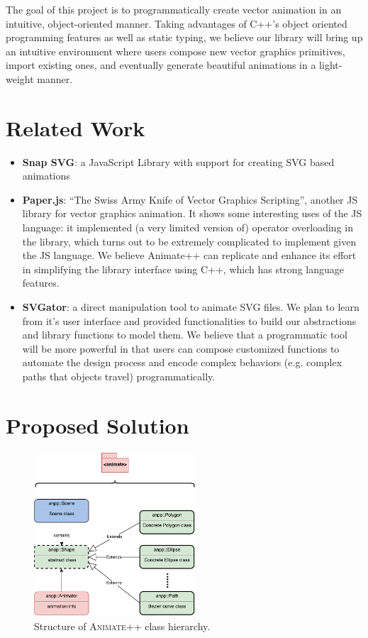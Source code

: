 \documentclass[10pt, nocopyrightspace, numbers]{assets/sigplanconf}
\begin{document}
The goal of this project is to programmatically create vector animation in an intuitive, object-oriented manner. Taking advantages of C++’s object oriented programming features as well as static typing, we believe our library will bring up an intuitive environment where users compose new vector graphics primitives, import existing ones, and eventually generate beautiful animations in a light-weight manner.

\section{Related Work}

\begin{itemize}
    \item
    \textbf{Snap SVG}: a JavaScript Library with support for creating SVG based animations
    \item
    \textbf{Paper.js}: “The Swiss Army Knife of Vector Graphics Scripting”, another JS library for vector graphics animation. It shows some interesting uses of the JS language: it implemented (a very limited version of) operator overloading in the library, which turns out to be extremely complicated to implement given the JS language. We believe Animate++ can replicate and enhance its effort in simplifying the library interface using C++, which has strong language features.
    \item
    \textbf{SVGator}: a direct manipulation tool to animate SVG files. We plan to learn from it’s user interface and provided functionalities to build our abstractions and library functions to model them. We believe that a programmatic tool will be more powerful in that users can compose customized functions to automate the design process and encode complex behaviors (e.g. complex paths that objects travel) programmatically.
\end{itemize}

\section{Proposed Solution}

\begin{figure}[H]
    \centering
    \includegraphics[width=6cm]{assets/animatepp-class-crop.pdf}
    \nocaptionrule \caption{\label{fig:class-diagram} Structure of \textsc{Animate++} class hierarchy.}
\end{figure}
\end{document}
